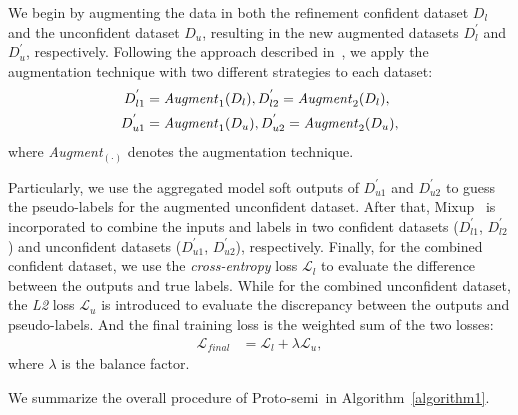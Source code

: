 \documentclass[letterpaper]{article} %
\newcommand{\method}{Proto-semi}
\begin{document}
We begin by augmenting the data in both the refinement confident dataset $D_l$ and the unconfident dataset $D_u$, resulting in the new augmented datasets $D_{l}^{'}$ and $D_{u}^{'}$, respectively.
Following the approach described in~\cite{DBLP:conf/nips/BaiYHYLMNL21}, we apply the augmentation technique with two different strategies to each dataset:
\begin{align}
  D_{l1}^{'} & = \text{\textit{Augment}}_{1}(D_l),  D_{l2}^{'} = \text{\textit{Augment}}_{2}(D_l), \label{equ:conf_aug}\\
  D_{u1}^{'} & = \text{\textit{Augment}}_{1}(D_u),  D_{u2}^{'} = \text{\textit{Augment}}_{2}(D_u),\label{equ:unconf_aug}
\end{align}
where \textit{Augment}$_{(\cdot)}$ denotes the augmentation technique.

Particularly, we use the aggregated model soft outputs of $D_{u1}^{'}$ and $D_{u2}^{'}$ to guess the pseudo-labels for the augmented unconfident dataset. After that, Mixup~\cite{DBLP:conf/iclr/ZhangCDL18} is incorporated to combine the inputs and labels in two confident datasets ($D_{l1}^{'}$, $D_{l2}^{'}$) and unconfident datasets ($D_{u1}^{'}$, $D_{u2}^{'}$), respectively.
Finally, for the combined confident dataset, we use the \textit{cross-entropy} loss $\mathcal{L}_{l}$ to evaluate the difference between the outputs and true labels. While for the combined unconfident dataset, the \textit{L2} loss $\mathcal{L}_{u}$ is introduced to evaluate the discrepancy between the outputs and pseudo-labels. And the final training loss is the weighted sum of the two losses:
\begin{align}
  \mathcal{L}_{final} & = \mathcal{L}_{l} +  \lambda \mathcal{L}_{u}\label{equ:loss},
\end{align}
where $\lambda$ is the balance factor.

We summarize the overall procedure of \method\ in Algorithm~\ref{algorithm1}.
\end{document}
